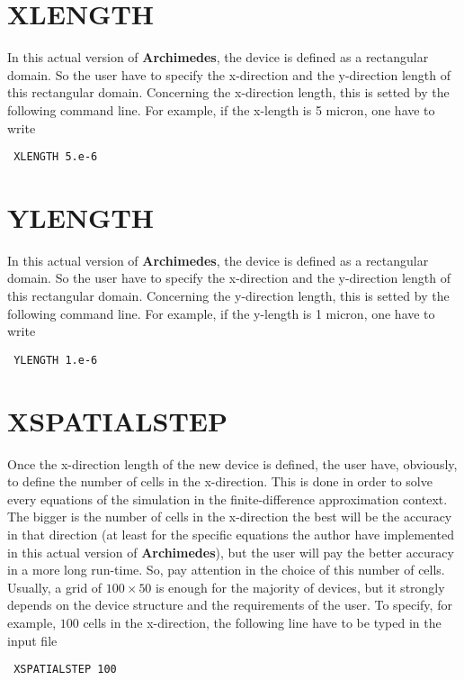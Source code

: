 \documentclass[12pt]{book}
\begin{document}
\section{XLENGTH}

In this actual version of \textbf{Archimedes}, the device is defined as a rectangular domain. So the user have to specify the x-direction and the y-direction length of this rectangular domain. Concerning the x-direction length, this is setted by the following command line. For example, if the x-length is 5 micron, one have to write
\begin{verbatim}
 XLENGTH 5.e-6
\end{verbatim}

\section{YLENGTH}

In this actual version of \textbf{Archimedes}, the device is defined as a rectangular domain. So the user have to specify the x-direction and the y-direction length of this rectangular domain. Concerning the y-direction length, this is setted by the following command line. For example, if the y-length is 1 micron, one have to write
\begin{verbatim}
 YLENGTH 1.e-6
\end{verbatim}

\section{XSPATIALSTEP}

Once the x-direction length of the new device is defined, the user have, obviously, to define the number of cells in the x-direction. This is done in order to solve every equations of the simulation in the finite-difference approximation context. The bigger is the number of cells in the x-direction the best will be the accuracy in that direction (at least for the specific equations the author have implemented in this actual version of \textbf{Archimedes}), but the user will pay the better accuracy in a more long run-time. So, pay attention in the choice of this number of cells. Usually, a grid of $100 \times 50$ is enough for the majority of devices, but it strongly depends on the device structure and the requirements of the user. To specify, for example, $100$ cells in the x-direction, the following line have to be typed in the input file
\begin{verbatim}
 XSPATIALSTEP 100
\end{verbatim}
\end{document}
